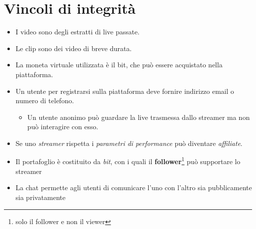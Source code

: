 \chapter{Vincoli di integrità}
\begin{itemize}
    \item I video sono degli estratti di live passate.
    \item Le clip sono dei video di breve durata.
    \item La moneta virtuale utilizzata è il bit, che può essere acquistato nella piattaforma.
    \item Un utente per registrarsi sulla piattaforma deve fornire indirizzo email o numero di telefono.
    \begin{itemize}
        \item Un utente anonimo può guardare la live trasmessa dallo streamer ma non può interagire con esso. 
    \end{itemize}
        \item Se uno \textit{streamer} rispetta i \textit{parametri di performance} può diventare \textit{affiliate}.
        \item Il portafoglio è costituito da \textit{bit}, con i quali il \textbf{follower}\footnote{solo il follower e non il viewer} può supportare lo streamer
        \item La chat permette agli utenti di comunicare l'uno con l'altro sia pubblicamente sia privatamente
\end{itemize}